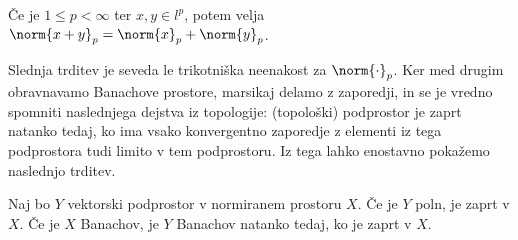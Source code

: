 \begin{trditev}[Minkowski]
  Če je $1 \le p < \infty$ ter $x, y \in l^p$, potem velja $\norm{x+y}_p =
  \norm{x}_p + \norm{y}_p$.
\end{trditev}

Slednja trditev je seveda le trikotniška neenakost za $\norm{\cdot}_p$.
Ker med drugim obravnavamo Banachove prostore, marsikaj delamo z zaporedji, in
se je vredno spomniti naslednjega dejstva iz topologije: (topološki) podprostor
je zaprt natanko tedaj, ko ima vsako konvergentno zaporedje z elementi iz tega
podprostora tudi limito v tem podprostoru.
Iz tega lahko enostavno pokažemo naslednjo trditev.

\begin{trditev}
  Naj bo $Y$ vektorski podprostor v normiranem prostoru $X$.
  Če je $Y$ poln, je zaprt v $X$.
  Če je $X$ Banachov, je $Y$ Banachov natanko tedaj, ko je zaprt v $X$.
\end{trditev}

